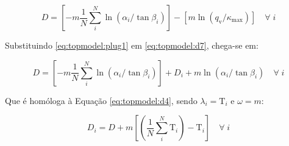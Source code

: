 \documentclass[./main.tex]{subfiles}
\begin{document}
\begin{linenomath*}
\begin{equation}
\label{eq:topmodel:d7}
D = \left[ -m\frac{1}{N} \sum^{N}_{i} \ln{(\alpha_{i}/\tan \beta_{i})}\right]  - \left[m \ln{(q_{\text{v}} /\kappa_{\text{max}})}\right] \quad  \forall \; i 
\end{equation}
\end{linenomath*}
Substituindo \eqref{eq:topmodel:plug1} em \eqref{eq:topmodel:d7}, chega-se em:
\begin{linenomath*}
\begin{equation}
\label{eq:topmodel:d8}
D = \left[ -m\frac{1}{N} \sum^{N}_{i} \ln{(\alpha_{i}/\tan \beta_{i})}\right] + D_{i} + m \ln{(\alpha_{i}/\tan \beta_{i})} \quad  \forall \; i 
\end{equation}
\end{linenomath*}
Que é homóloga à Equação \eqref{eq:topmodel:d4}, sendo $\lambda_{i} = \text{T}_{i} $ e $\omega = m$:
\begin{linenomath*}
\begin{equation}
\label{eq:topmodel:d9}
D_{i}= D +   m  \left[ \left( \frac{1}{N} \sum^{N}_{i} \text{T}_{i}\right) - \text{T}_{i}\right] \quad  \forall \; i 
\end{equation}
\end{linenomath*}
\end{document}
